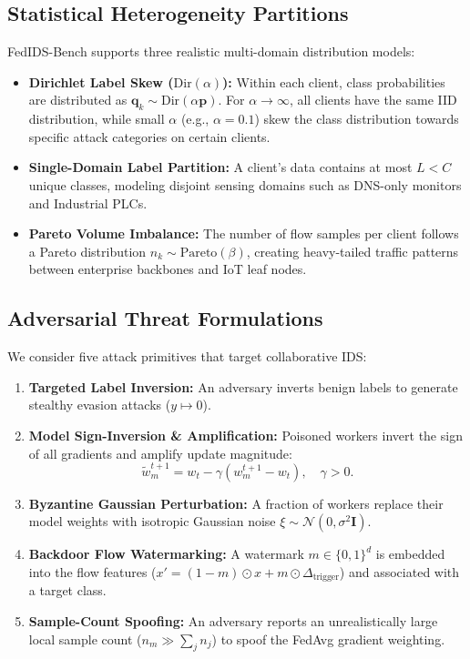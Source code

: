 \documentclass[conference]{IEEEtran}
\begin{document}
\subsection{Statistical Heterogeneity Partitions}
FedIDS-Bench supports three realistic multi-domain distribution models:
\begin{itemize}
    \item \textbf{Dirichlet Label Skew ($\text{Dir}(\alpha)$):} Within each client, class probabilities are distributed as $\mathbf{q}_k \sim \text{Dir}(\alpha \mathbf{p})$. For $\alpha \to \infty$, all clients have the same IID distribution, while small $\alpha$ (e.g., $\alpha = 0.1$) skew the class distribution towards specific attack categories on certain clients.
    \item \textbf{Single-Domain Label Partition:} A client's data contains at most $L < C$ unique classes, modeling disjoint sensing domains such as DNS-only monitors and Industrial PLCs.
    \item \textbf{Pareto Volume Imbalance:} The number of flow samples per client follows a Pareto distribution $n_k \sim \text{Pareto}(\beta)$, creating heavy-tailed traffic patterns between enterprise backbones and IoT leaf nodes.
\end{itemize}

\subsection{Adversarial Threat Formulations}
We consider five attack primitives that target collaborative IDS:
\begin{enumerate}
    \item \textbf{Targeted Label Inversion:} An adversary inverts benign labels to generate stealthy evasion attacks ($y \mapsto 0$).
    \item \textbf{Model Sign-Inversion \& Amplification:} Poisoned workers invert the sign of all gradients and amplify update magnitude:
    \begin{equation}
    \tilde{w}_m^{t+1} = w_t - \gamma (w_m^{t+1} - w_t), \quad \gamma > 0.
    \end{equation}
    \item \textbf{Byzantine Gaussian Perturbation:} A fraction of workers replace their model weights with isotropic Gaussian noise $\xi \sim \mathcal{N}(0, \sigma^2 \mathbf{I})$.
    \item \textbf{Backdoor Flow Watermarking:} A watermark $m \in \{0, 1\}^d$ is embedded into the flow features ($x' = (1 - m) \odot x + m \odot \Delta_{\text{trigger}}$) and associated with a target class.
    \item \textbf{Sample-Count Spoofing:} An adversary reports an unrealistically large local sample count ($n_m \gg \sum_j n_j$) to spoof the FedAvg gradient weighting.
\end{enumerate}
\end{document}
